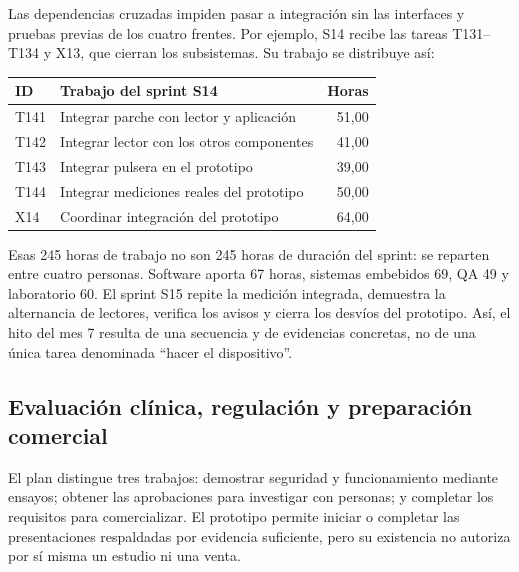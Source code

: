 Las dependencias cruzadas impiden pasar a integración sin las interfaces y pruebas previas de los cuatro frentes. Por ejemplo, S14 recibe las tareas T131--T134 y X13, que cierran los subsistemas. Su trabajo se distribuye así:
\begin{center}\small\begin{tabularx}{\linewidth}{l X r}\toprule
ID & Trabajo del sprint S14 & Horas\\\midrule
T141 & Integrar parche con lector y aplicación & 51,00\\
T142 & Integrar lector con los otros componentes & 41,00\\
T143 & Integrar pulsera en el prototipo & 39,00\\
T144 & Integrar mediciones reales del prototipo & 50,00\\
X14 & Coordinar integración del prototipo & 64,00\\
\bottomrule\end{tabularx}\end{center}
Esas 245 horas de trabajo no son 245 horas de duración del sprint: se reparten entre cuatro personas. Software aporta 67 horas, sistemas embebidos 69, QA 49 y laboratorio 60. El sprint S15 repite la medición integrada, demuestra la alternancia de lectores, verifica los avisos y cierra los desvíos del prototipo. Así, el hito del mes 7 resulta de una secuencia y de evidencias concretas, no de una única tarea denominada ``hacer el dispositivo''.

\subsection{Evaluación clínica, regulación y preparación comercial}\label{sec:regulacion}
El plan distingue tres trabajos: demostrar seguridad y funcionamiento mediante ensayos; obtener las aprobaciones para investigar con personas; y completar los requisitos para comercializar. El prototipo permite iniciar o completar las presentaciones respaldadas por evidencia suficiente, pero su existencia no autoriza por sí misma un estudio ni una venta.


